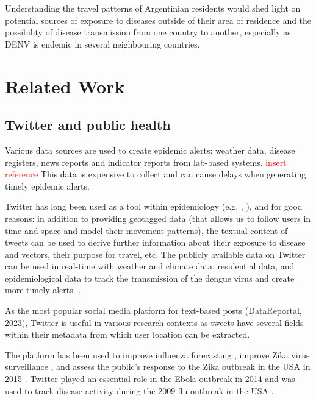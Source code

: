 Understanding the travel patterns of Argentinian residents would shed light on potential sources of exposure to diseases outside of their area of residence and the possibility of disease transmission from one country to another, especially as DENV is endemic in several neighbouring countries. \cite{queiroz_overlap_2022}


\section{Related Work}
\subsection{Twitter and public health}

Various data sources are used to create epidemic alerts: weather data, disease registers, news reports and indicator reports from lab-based systems. \textcolor{red}{insert reference} This data is expensive to collect and can cause delays when generating timely epidemic alerts. 

Twitter has long been used as a tool within epidemiology (e.g. \cite{culotta_towards_2010}, \cite{chunara_social_2012}), and for good reasons: in addition to providing geotagged data (that allows us to follow users in time and space and model their movement patterns), the textual content of tweets can be used to derive further information about their exposure to disease and vectors, their purpose for travel, etc. The publicly available data on Twitter can be used in real-time with weather and climate data, residential data, and epidemiological data to track the transmission of the dengue virus and create more timely alerts. \cite{codeco_infodengue_2018}.

As the most popular social media platform for text-based posts \cite{noauthor_digital_nodate}(DataReportal, 2023), Twitter is useful in various research contexts as tweets have several fields within their metadata from which user location can be extracted.

The platform has been used to improve influenza forecasting \cite{paul_discovering_2014}, improve Zika virus surveillance \cite{masri_use_2019}, and assess the public's response to the Zika outbreak in the USA in 2015 \cite{fu_how_2016}. Twitter played an essential role in the Ebola outbreak in 2014 \cite{carter_how_2014} and was used to track disease activity during the 2009 flu outbreak in the USA \cite{signorini_use_2011}.

